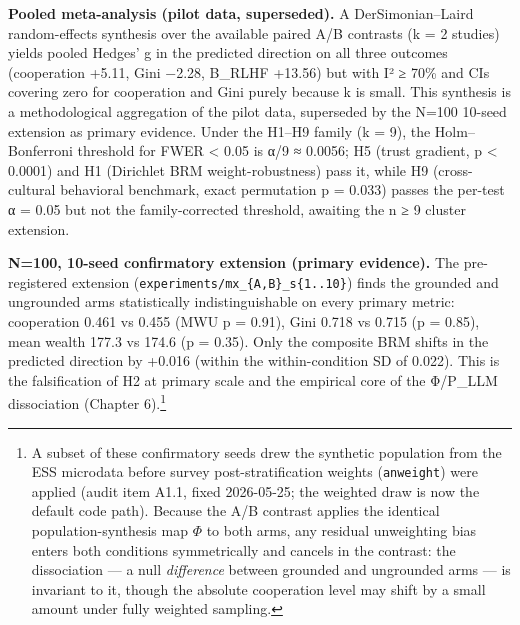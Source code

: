 
\textbf{Pooled meta-analysis (pilot data, superseded).} A DerSimonian–Laird random-effects synthesis over the available paired A/B contrasts (k = 2 studies) yields pooled Hedges' g in the predicted direction on all three outcomes (cooperation +5.11, Gini −2.28, B\_RLHF +13.56) but with I² ≥ 70\% and CIs covering zero for cooperation and Gini purely because k is small. This synthesis is a methodological aggregation of the pilot data, superseded by the N=100 10-seed extension as primary evidence. Under the H1–H9 family (k = 9), the Holm–Bonferroni threshold for FWER < 0.05 is α/9 ≈ 0.0056; H5 (trust gradient, p < 0.0001) and H1 (Dirichlet BRM weight-robustness) pass it, while H9 (cross-cultural behavioral benchmark, exact permutation p = 0.033) passes the per-test α = 0.05 but not the family-corrected threshold, awaiting the n ≥ 9 cluster extension.

\textbf{N=100, 10-seed confirmatory extension (primary evidence).} The pre-registered extension (\texttt{experiments/mx\_\{A,B\}\_s\{1..10\}}) finds the grounded and ungrounded arms statistically indistinguishable on every primary metric: cooperation 0.461 vs 0.455 (MWU p = 0.91), Gini 0.718 vs 0.715 (p = 0.85), mean wealth 177.3 vs 174.6 (p = 0.35). Only the composite BRM shifts in the predicted direction by +0.016 (within the within-condition SD of 0.022). This is the falsification of H2 at primary scale and the empirical core of the Φ/P\_LLM dissociation (Chapter 6).\footnote{A subset of these confirmatory seeds drew the synthetic population from the ESS microdata before survey post-stratification weights (\texttt{anweight}) were applied (audit item A1.1, fixed 2026-05-25; the weighted draw is now the default code path). Because the A/B contrast applies the identical population-synthesis map $\Phi$ to both arms, any residual unweighting bias enters both conditions symmetrically and cancels in the contrast: the dissociation — a null \emph{difference} between grounded and ungrounded arms — is invariant to it, though the absolute cooperation level may shift by a small amount under fully weighted sampling.}

